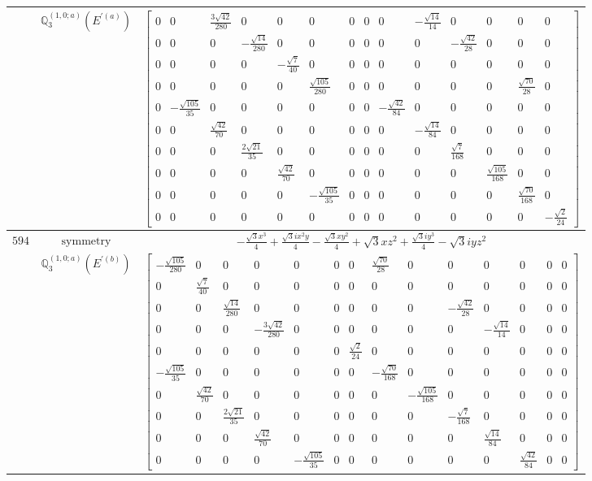 \documentclass[fleqn,8pt,landscape]{jsarticle}
\begin{document}
\begin{longtable}{ccc}
$  $ & $ \mathbb{Q}_{3}^{(1,0;a)}(E^{\prime(a)}) $ & $ \begin{bmatrix} 0 & 0 & \frac{3 \sqrt{42}}{280} & 0 & 0 & 0 & 0 & 0 & 0 & - \frac{\sqrt{14}}{14} & 0 & 0 & 0 & 0 \\ 0 & 0 & 0 & - \frac{\sqrt{14}}{280} & 0 & 0 & 0 & 0 & 0 & 0 & - \frac{\sqrt{42}}{28} & 0 & 0 & 0 \\ 0 & 0 & 0 & 0 & - \frac{\sqrt{7}}{40} & 0 & 0 & 0 & 0 & 0 & 0 & 0 & 0 & 0 \\ 0 & 0 & 0 & 0 & 0 & \frac{\sqrt{105}}{280} & 0 & 0 & 0 & 0 & 0 & 0 & \frac{\sqrt{70}}{28} & 0 \\ 0 & - \frac{\sqrt{105}}{35} & 0 & 0 & 0 & 0 & 0 & 0 & - \frac{\sqrt{42}}{84} & 0 & 0 & 0 & 0 & 0 \\ 0 & 0 & \frac{\sqrt{42}}{70} & 0 & 0 & 0 & 0 & 0 & 0 & - \frac{\sqrt{14}}{84} & 0 & 0 & 0 & 0 \\ 0 & 0 & 0 & \frac{2 \sqrt{21}}{35} & 0 & 0 & 0 & 0 & 0 & 0 & \frac{\sqrt{7}}{168} & 0 & 0 & 0 \\ 0 & 0 & 0 & 0 & \frac{\sqrt{42}}{70} & 0 & 0 & 0 & 0 & 0 & 0 & \frac{\sqrt{105}}{168} & 0 & 0 \\ 0 & 0 & 0 & 0 & 0 & - \frac{\sqrt{105}}{35} & 0 & 0 & 0 & 0 & 0 & 0 & \frac{\sqrt{70}}{168} & 0 \\ 0 & 0 & 0 & 0 & 0 & 0 & 0 & 0 & 0 & 0 & 0 & 0 & 0 & - \frac{\sqrt{2}}{24} \end{bmatrix} $ \\ \hline
$ 594 $ & $ \text{symmetry} $ & $ - \frac{\sqrt{3} x^{3}}{4} + \frac{\sqrt{3} i x^{2} y}{4} - \frac{\sqrt{3} x y^{2}}{4} + \sqrt{3} x z^{2} + \frac{\sqrt{3} i y^{3}}{4} - \sqrt{3} i y z^{2} $ \\
$  $ & $ \mathbb{Q}_{3}^{(1,0;a)}(E^{\prime(b)}) $ & $ \begin{bmatrix} - \frac{\sqrt{105}}{280} & 0 & 0 & 0 & 0 & 0 & 0 & \frac{\sqrt{70}}{28} & 0 & 0 & 0 & 0 & 0 & 0 \\ 0 & \frac{\sqrt{7}}{40} & 0 & 0 & 0 & 0 & 0 & 0 & 0 & 0 & 0 & 0 & 0 & 0 \\ 0 & 0 & \frac{\sqrt{14}}{280} & 0 & 0 & 0 & 0 & 0 & 0 & - \frac{\sqrt{42}}{28} & 0 & 0 & 0 & 0 \\ 0 & 0 & 0 & - \frac{3 \sqrt{42}}{280} & 0 & 0 & 0 & 0 & 0 & 0 & - \frac{\sqrt{14}}{14} & 0 & 0 & 0 \\ 0 & 0 & 0 & 0 & 0 & 0 & \frac{\sqrt{2}}{24} & 0 & 0 & 0 & 0 & 0 & 0 & 0 \\ - \frac{\sqrt{105}}{35} & 0 & 0 & 0 & 0 & 0 & 0 & - \frac{\sqrt{70}}{168} & 0 & 0 & 0 & 0 & 0 & 0 \\ 0 & \frac{\sqrt{42}}{70} & 0 & 0 & 0 & 0 & 0 & 0 & - \frac{\sqrt{105}}{168} & 0 & 0 & 0 & 0 & 0 \\ 0 & 0 & \frac{2 \sqrt{21}}{35} & 0 & 0 & 0 & 0 & 0 & 0 & - \frac{\sqrt{7}}{168} & 0 & 0 & 0 & 0 \\ 0 & 0 & 0 & \frac{\sqrt{42}}{70} & 0 & 0 & 0 & 0 & 0 & 0 & \frac{\sqrt{14}}{84} & 0 & 0 & 0 \\ 0 & 0 & 0 & 0 & - \frac{\sqrt{105}}{35} & 0 & 0 & 0 & 0 & 0 & 0 & \frac{\sqrt{42}}{84} & 0 & 0 \end{bmatrix} $ \\ \hline

\end{longtable}
\end{document}
